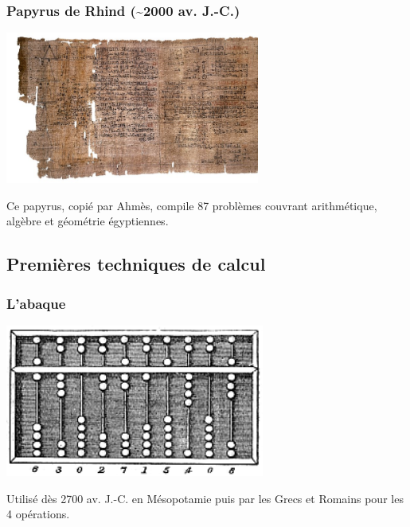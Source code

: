 \documentclass[11pt]{article}
\begin{document}
\subsubsection{Papyrus de Rhind (\textasciitilde{}2000 av. J.-C.)}
\label{sec:orgee57844}

\begin{center}
\includegraphics[width=0.8\linewidth, height=5cm, keepaspectratio]{./images/Rhind-Papyrus.jpg}
\end{center}

Ce papyrus, copié par Ahmès, compile 87 problèmes couvrant
arithmétique, algèbre et géométrie égyptiennes.


\newpage

\subsection{Premières techniques de calcul}
\label{sec:orgc1ac6c8}

\subsubsection{L’abaque}
\label{sec:org2deaa6a}

\begin{center}
\includegraphics[width=0.8\linewidth, height=5cm, keepaspectratio]{./images/Abacus.png}
\end{center}

Utilisé dès 2700 av. J.-C. en Mésopotamie puis par les Grecs et
Romains pour les 4 opérations.
\end{document}
